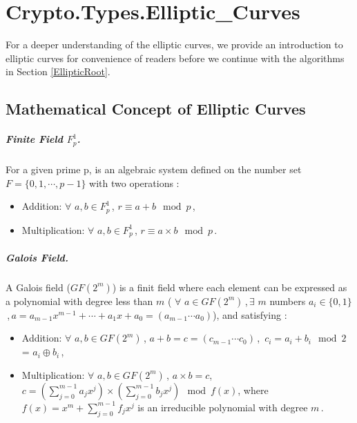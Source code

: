 \chapter{Crypto.Types.Elliptic\_Curves}\label{ConceptofElliptic}
For a deeper understanding of the elliptic curves, we provide an
introduction to elliptic curves for convenience of readers before we
continue with the algorithms in Section \ref{EllipticRoot}.


\section{Mathematical Concept of Elliptic Curves}
\paragraph{Finite Field $F_p^1$.}
For a given prime p, is an algebraic system defined on the number set
$F=\{0,1,\cdots,p-1\}$ with two operations \cite{SimpleTutorial}:

\begin{itemize}
\item Addition: $\forall$ $a,b\in F_p^1$\,, $r\equiv a+b \mod p$\,,
\item Multiplication: $\forall$ $a,b\in F_p^1$\,, $r\equiv a\times b \mod p$\,.
\end{itemize}

\paragraph{Galois Field.} A Galois field ($GF(2^m)$) is a finit field
where each element can be  expressed as a polynomial with degree less than $m$ (
$\forall$ $a \in GF(2^m)$\,,\,$\exists$ $m$ numbers $a_i\in
\{0,1\}$\,,\,$a=a_{m-1}x^{m-1}+\cdots +a_1x+a_0=(a_{m-1}\cdots a_0)$),
and satisfying \cite{SimpleTutorial}:
\begin{itemize}
\item Addition: $\forall$ $a,b\in GF(2^m)$\,, $a+b=c=(c_{m-1}\cdots
  c_0)$\,,\, $c_i=a_i+b_i\mod 2$ = $a_i\oplus b_i$\,,
\item Multiplication: $\forall$ $a,b\in GF(2^m)$\,, $a\times b=c$,
  $c=(\sum_{j=0}^{m-1}a_jx^j)\times (\sum_{j=0}^{m-1}b_jx^j)\mod
  f(x)$, where $f(x)=x^m+\sum_{j=0}^{m-1}f_jx^j$ is an irreducible
  polynomial with degree $m$\,.
\end{itemize}

